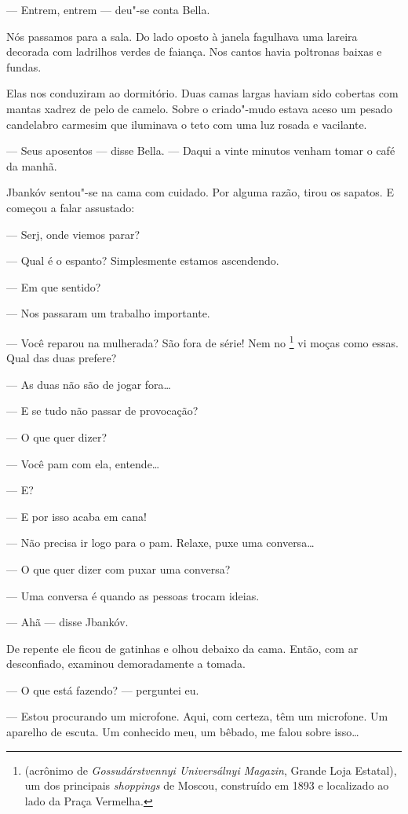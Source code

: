 --- Entrem, entrem --- deu"-se conta Bella.

Nós passamos para a sala. Do lado oposto à janela fagulhava uma lareira
decorada com ladrilhos verdes de faiança. Nos cantos havia poltronas
baixas e fundas.

Elas nos conduziram ao dormitório. Duas camas largas haviam sido
cobertas com mantas xadrez de pelo de camelo. Sobre o criado"-mudo estava
aceso um pesado candelabro carmesim que iluminava o teto com uma luz
rosada e vacilante.

--- Seus aposentos --- disse Bella. --- Daqui a
vinte minutos venham tomar o café da manhã.

Jbankóv sentou"-se na cama com cuidado. Por alguma razão, tirou os
sapatos. E começou a falar assustado:

--- Serj, onde viemos parar?

--- Qual é o espanto? Simplesmente estamos ascendendo.

--- Em que sentido?

--- Nos passaram um trabalho importante.

--- Você reparou na mulherada? São fora de série! Nem no
\footnote{ (acrônimo de \emph{Gossudárstvennyi Universálnyi
  Magazin}, Grande Loja Estatal), um dos principais \emph{shoppings} de
  Moscou, construído em 1893 e localizado ao lado da Praça Vermelha.} vi
moças como essas. Qual das duas prefere?

--- As duas não são de jogar fora\ldots{}

--- E se tudo não passar de provocação?

--- O que quer dizer?

--- Você pam com ela, entende\ldots{}

--- E?

--- E por isso acaba em cana!

--- Não precisa ir logo para o pam. Relaxe, puxe uma conversa\ldots{}

--- O que quer dizer com puxar uma conversa?

--- Uma conversa é quando as pessoas trocam ideias.

--- Ahã --- disse Jbankóv.

De repente ele ficou de gatinhas e olhou debaixo da cama. Então, com ar
desconfiado, examinou demoradamente a tomada.

--- O que está fazendo? --- perguntei eu.

--- Estou procurando um microfone. Aqui, com certeza, têm um
microfone. Um aparelho de escuta. Um conhecido meu, um bêbado, me falou
sobre isso\ldots{}

